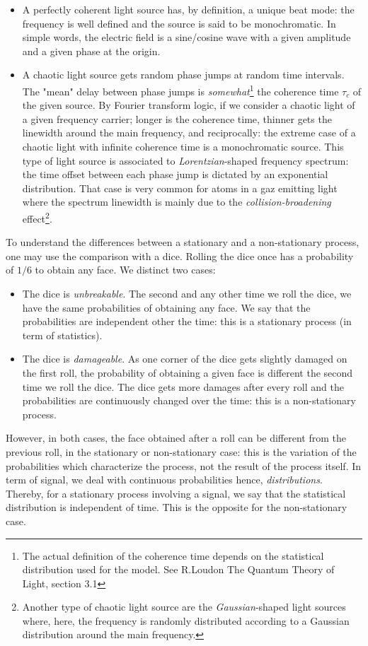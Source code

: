 \documentclass[11pt]{report}
\begin{document}
\begin{itemize}
	\item A perfectly coherent light source has, by definition, a unique beat mode: the frequency is well defined and the source is said to be monochromatic. In simple words, the electric field is a sine/cosine wave with a given amplitude and a given phase at the origin.
	\item A chaotic light source gets random phase jumps at random time intervals. The "mean" delay between phase jumps is \textit{somewhat}\footnote{The actual definition of the coherence time depends on the statistical distribution used for the model. See R.Loudon The Quantum Theory of Light, section 3.1} the coherence time $\tau_c$ of the given source. By Fourier transform logic, if we consider a chaotic light of a given frequency carrier; longer is the coherence time, thinner gets the linewidth around the main frequency, and reciprocally: the extreme case of a chaotic light with infinite coherence time is a monochromatic source. This type of light source is associated to \textit{Lorentzian}-shaped frequency spectrum: the time offset between each phase jump is dictated by an exponential distribution. That case is very common for atoms in a gaz emitting light where the spectrum linewidth is mainly due to the \textit{collision-broadening} effect\footnote{Another type of chaotic light source are the \textit{Gaussian}-shaped light sources where, here, the frequency is randomly distributed according to a Gaussian distribution around the main frequency.}.
\end{itemize}

To understand the differences between a stationary and a non-stationary process, one may use the comparison with a dice. Rolling the dice once has a probability  of $1/6$ to obtain any face. We distinct two cases:
\begin{itemize}
	\item The dice is \textit{unbreakable}. The second and any other time we roll the dice, we have the same probabilities of obtaining any face. We say that the probabilities are independent other the time: this is a stationary process (in term of statistics).
	\item The dice is \textit{damageable}. As one corner of the dice gets slightly damaged on the first roll, the probability of obtaining a given face is different the second time we roll the dice. The dice gets more damages after every roll and the probabilities are continuously changed over the time: this is a non-stationary process.
\end{itemize}
However, in both cases, the face obtained after a roll can be different from the previous roll, in the stationary or non-stationary case: this is the variation of the probabilities which characterize the process, not the result of the process itself. In term of signal, we deal with continuous probabilities hence, \textit{distributions}. Thereby, for a stationary process involving a signal, we say that the statistical distribution is independent of time. This is the opposite for the non-stationary case.
\end{document}
